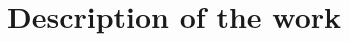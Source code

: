 \section{Description of the work}



\begin{comment}
After the sections above, there is a description of what you have done. It would help if you did not use the heading above but replaced it with appropriate titles, depending on your work. The structure should be made clear by the section headings. Having a clear, logical structure and a narrative flow is essential. You should include the advanced background knowledge necessary to understand how you solved the assignment and define hypotheses and critical concepts. The description of experiments should be such that it is possible to repeat them. If such a description is very long and detailed, you can put it in an appendix. See below.  
\end{comment}

